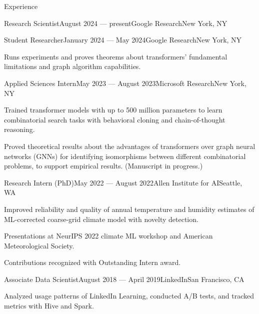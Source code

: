 \documentclass{resume} %
\begin{document}
\begin{rSection}{Experience}

\begin{rSubsection}{Research Scientist}{August 2024 --- present}{Google Research}{New York, NY}
\end{rSubsection}


\begin{rSubsection}{Student Researcher}{January 2024 --- May 2024}{Google Research}{New York, NY}
\item Runs experiments and proves theorems about transformers' fundamental limitations and graph algorithm capabilities.
\end{rSubsection}

\begin{rSubsection}{Applied Sciences Intern}{May 2023 --- August 2023}{Microsoft Research}{New York, NY}
\item Trained transformer models with up to 500 million parameters to learn combinatorial search tasks with behavioral cloning and chain-of-thought reasoning.
\item Proved theoretical results about the advantages of transformers over graph neural networks (GNNs) for identifying isomorphisms between different combinatorial problems, to support empirical results. (Manuscript in progress.) 
\end{rSubsection}

\begin{rSubsection}{Research Intern (PhD)}{May 2022 --- August 2022}{Allen Institute for AI}{Seattle, WA}
\item Improved reliability and quality of annual temperature and humidity estimates of ML-corrected coarse-grid climate model with novelty detection.
\item Presentations at NeurIPS 2022 climate ML workshop and American Meteorological Society.
\item Contributions recognized with Outstanding Intern award.
\end{rSubsection}



\begin{rSubsection}{Associate Data Scientist}{August 2018 --- April 2019}{LinkedIn}{San Francisco, CA}
\item Analyzed usage patterns of LinkedIn Learning, conducted A/B tests, and tracked metrics with Hive and Spark.
\end{rSubsection}
\end{rSection}
\end{document}
